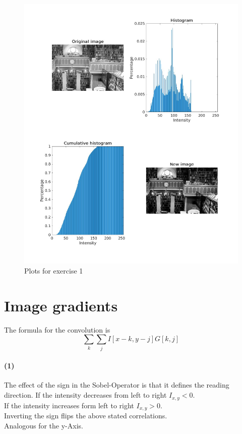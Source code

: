 \documentclass[a4paper]{article}
\begin{document}
\begin{figure}[htp]
    \centering
    \includegraphics[width=\textwidth]{plot01.jpg}
    \caption{Plots for exercise 1}
    \label{plot01}
\end{figure}

\newpage

\section{Image gradients}
The formula for the convolution is 
\begin{equation*}
    \sum_k\sum_j I[x-k,y-j]G[k,j]
\end{equation*}
\paragraph{(1)}
The effect of the sign in the Sobel-Operator is that it defines the reading direction. If the intensity decreases from left to right $I_{x,y}<0$.\\
If the intensity increases form left to right $I_{x,y}>0$.\\
Inverting the sign flips the above stated correlations.\\
Analogous for the y-Axis.
\end{document}
